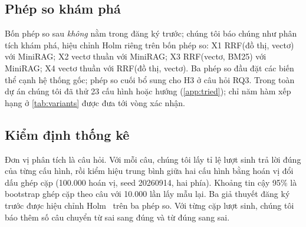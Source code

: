\subsection{Phép so khám phá}\label{sec:exploratory}
Bốn phép so sau \emph{không} nằm trong đăng ký trước; chúng tôi báo chúng như phân tích khám phá, hiệu chỉnh Holm riêng trên bốn phép so:
X1 RRF(đồ thị, vectơ) với MiniRAG; X2 vectơ thuần với MiniRAG; X3 RRF(vectơ, BM25) với MiniRAG; X4 vectơ thuần với RRF(đồ thị, vectơ).
Ba phép so đầu đặt các biến thể cạnh hệ thống gốc; phép so cuối bổ sung cho H3 ở câu hỏi RQ3.
Trong toàn dự án chúng tôi đã thử 23 cấu hình hoặc hướng (\cref{app:tried}); chỉ năm hàm xếp hạng ở \cref{tab:variants} được đưa tới vòng xác nhận.

\subsection{Kiểm định thống kê}\label{sec:stats}
Đơn vị phân tích là câu hỏi.
Với mỗi câu, chúng tôi lấy tỉ lệ lượt sinh trả lời đúng của từng cấu hình, rồi kiểm hiệu trung bình giữa hai cấu hình bằng hoán vị đổi dấu ghép cặp (100.000 hoán vị, seed 20260914, hai phía).
Khoảng tin cậy 95\% là bootstrap ghép cặp theo câu với 10.000 lần lấy mẫu lại.
Ba giả thuyết đăng ký trước được hiệu chỉnh Holm~\cite{holm1979} trên ba phép so.
Với từng cặp lượt sinh, chúng tôi báo thêm số câu chuyển từ sai sang đúng và từ đúng sang sai.
